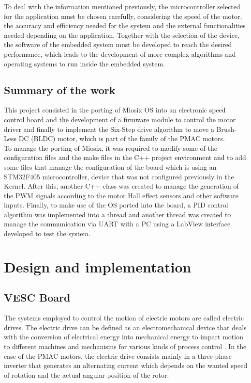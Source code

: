 To deal with the information mentioned previously, the microcontroller selected for the application must be chosen carefully, considering the speed of the motor, the accuracy and efficiency needed for the system and the external functionalities needed depending on the application. Together with the selection of the device, the software of the embedded system must be developed to reach the desired performance, which leads to the development of more complex algorithms and operating systems to run inside the embedded system.\\

\subsection{Summary of the work}
This project consisted in the porting of Miosix OS into an electronic speed control board and the development of a firmware module to control the motor driver and finally to implement the Six-Step drive algorithm to move a Brush-Less DC (BLDC) motor, which is part of the family of the PMAC motors.\\

To manage the porting of Miosix, it was required to modify some of the configuration files and the make files in the C++ project environment and to add some files that manage the configuration of the board which is using an STM32F405 microcontroller, device that was not configured previously in the Kernel. After this, another C++ class was created to manage the generation of the PWM signals according to the motor Hall effect sensors and other software inputs. Finally, to make use of the OS ported into the board, a PID control algorithm was implemented into a thread and another thread was created to manage the communication via UART with a PC using a LabView interface developed to test the system.
\pagebreak

\section{Design and implementation}
\subsection{VESC Board}

The systems employed to control the motion of electric motors are called electric drives. The electric drive can be defined as an electromechanical device that deals with the conversion of electrical energy into mechanical energy to impart motion to different machines and mechanisms for various kinds of process control \cite{GhioniElecDrives}. In the case of the PMAC motors, the electric drive consists mainly in a three-phase inverter that generates an alternating current which depends on the wanted speed of rotation and the actual angular position of the rotor. \\

